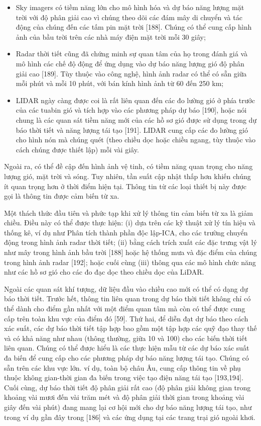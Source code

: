 \documentclass[utf8]{frontiersSCNS} %
\begin{document}
\begin{itemize}
\item Sky imagers có tiềm năng lớn cho mô hình hóa và dự báo năng lượng mặt trời với độ phân giải cao vì chúng theo dõi các đám mây di chuyển và tác động của chúng đến các tấm pin mặt trời [188]. Chúng có thể cung cấp hình ảnh của bầu trời trên các nhà máy điện mặt trời mỗi 30 giây;

\item Radar thời tiết cũng đã chứng minh sự quan tâm của họ trong đánh giá và mô hình các chế độ động để ứng dụng vào dự báo năng lượng gió độ phân giải cao [189]. Tùy thuộc vào công nghệ, hình ảnh radar có thể có sẵn giữa mỗi phút và mỗi 10 phút, với bán kính hình ảnh từ 60 đến 250 km;

\item LIDAR ngày càng được coi là rất liên quan đến các đo lường gió ở phía trước của các tuabin gió và tích hợp vào các phương pháp dự báo [190], hoặc nói chung là các quan sát tiềm năng mới của các hồ sơ gió được sử dụng trong dự báo thời tiết và năng lượng tái tạo [191]. LIDAR cung cấp các đo lường gió cho hình nón mà chúng quét (theo chiều dọc hoặc chiều ngang, tùy thuộc vào cách chúng được thiết lập) mỗi vài giây.
\end{itemize}

Ngoài ra, có thể đề cập đến hình ảnh vệ tinh, có tiềm năng quan trọng cho năng lượng gió, mặt trời và sóng. Tuy nhiên, tần suất cập nhật thấp hơn khiến chúng ít quan trọng hơn ở thời điểm hiện tại. Thông tin từ các loại thiết bị này được gọi là thông tin được cảm biến từ xa.

Một thách thức đầu tiên và phức tạp khi xử lý thông tin cảm biến từ xa là giảm chiều. Điều này có thể được thực hiện: (i) dựa trên các kỹ thuật xử lý tín hiệu và thống kê, ví dụ như Phân tích thành phần độc lập-ICA, cho các trường chuyển động trong hình ảnh radar thời tiết; (ii) bằng cách trích xuất các đặc trưng vật lý như mây trong hình ảnh bầu trời [188] hoặc hệ thống mưa và đặc điểm của chúng trong hình ảnh radar [192]; hoặc cuối cùng (iii) thông qua các mô hình chức năng như các hồ sơ gió cho các đo đạc dọc theo chiều dọc của LiDAR.

Ngoài các quan sát khí tượng, dữ liệu đầu vào chiều cao mới có thể có dạng dự báo thời tiết. Trước hết, thông tin liên quan trong dự báo thời tiết không chỉ có thể dành cho điểm gần nhất với một điểm quan tâm mà còn có thể được cung cấp trên toàn khu vực của điểm đó [59]. Thứ hai, để diễn đạt dự báo theo cách xác suất, các dự báo thời tiết tập hợp bao gồm một tập hợp các quỹ đạo thay thế và có khả năng như nhau (thông thường, giữa 10 và 100) cho các biến thời tiết liên quan. Chúng có thể được hiểu là các thực hiện mẫu từ các dự báo xác suất đa biến để cung cấp cho các phương pháp dự báo năng lượng tái tạo. Chúng có sẵn trên các khu vực lớn. ví dụ, toàn bộ châu Âu, cung cấp thông tin về phụ thuộc không gian-thời gian đa biến trong việc tạo điện năng tái tạo [193,194]. Cuối cùng, dự báo thời tiết độ phân giải rất cao (độ phân giải không gian trong khoảng vài mươi đến vài trăm mét và độ phân giải thời gian trong khoảng vài giây đến vài phút) đang mang lại cơ hội mới cho dự báo năng lượng tái tạo, như trong ví dụ gần đây trong [186] và các ứng dụng tại các trang trại gió ngoài khơi.
\end{document}
